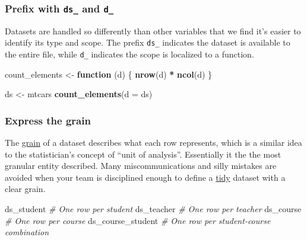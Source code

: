 \documentclass[
]{book}
\newenvironment{Shaded}{\begin{snugshade}}{\end{snugshade}}
\newcommand{\CommentTok}[1]{\textcolor[rgb]{0.56,0.35,0.01}{\textit{#1}}}
\newcommand{\ControlFlowTok}[1]{\textcolor[rgb]{0.13,0.29,0.53}{\textbf{#1}}}
\newcommand{\DataTypeTok}[1]{\textcolor[rgb]{0.13,0.29,0.53}{#1}}
\newcommand{\KeywordTok}[1]{\textcolor[rgb]{0.13,0.29,0.53}{\textbf{#1}}}
\newcommand{\NormalTok}[1]{#1}
\newcommand{\OperatorTok}[1]{\textcolor[rgb]{0.81,0.36,0.00}{\textbf{#1}}}
\newcommand{\StringTok}[1]{\textcolor[rgb]{0.31,0.60,0.02}{#1}}
\begin{document}
\hypertarget{style-naming-datasets-prefix}{%
\subsubsection{\texorpdfstring{Prefix with \texttt{ds\_} and \texttt{d\_}}{Prefix with ds\_ and d\_}}\label{style-naming-datasets-prefix}}

Datasets are handled so differently than other variables that we find it's easier to identify its type and scope. The prefix \texttt{ds\_} indicates the dataset is available to the entire file, while \texttt{d\_} indicates the scope is localized to a function.

\begin{Shaded}
\begin{Highlighting}[]
\NormalTok{count\_elements <{-}}\StringTok{ }\ControlFlowTok{function}\NormalTok{ (d) \{}
  \KeywordTok{nrow}\NormalTok{(d) }\OperatorTok{*}\StringTok{ }\KeywordTok{ncol}\NormalTok{(d)}
\NormalTok{\}}

\NormalTok{ds <{-}}\StringTok{ }\NormalTok{mtcars}
\KeywordTok{count\_elements}\NormalTok{(}\DataTypeTok{d =}\NormalTok{ ds)}
\end{Highlighting}
\end{Shaded}

\hypertarget{style-naming-datasets-grain}{%
\subsubsection{Express the grain}\label{style-naming-datasets-grain}}

The \href{https://gerardnico.com/olap/dimensional_modeling/grain\#grain}{grain} of a dataset describes what each row represents, which is a similar idea to the statistician's concept of ``unit of analysis''. Essentially it the the most granular entity described. Many miscommunications and silly mistakes are avoided when your team is disciplined enough to define a \href{https://r4ds.had.co.nz/tidy-data.html}{tidy} dataset with a clear grain.

\begin{Shaded}
\begin{Highlighting}[]
\NormalTok{ds\_student          }\CommentTok{\# One row per student}
\NormalTok{ds\_teacher          }\CommentTok{\# One row per teacher}
\NormalTok{ds\_course           }\CommentTok{\# One row per course}
\NormalTok{ds\_course\_student   }\CommentTok{\# One row per student{-}course combination}
\end{Highlighting}
\end{Shaded}
\end{document}
